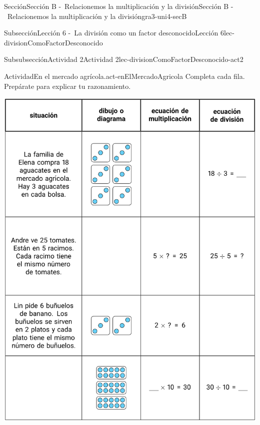 %
%
\typeout{************************************************}
\typeout{************************************************}
%
\begin{sectionptx}{Sección}{Sección B -~Relacionemos la multiplicación y la división}{}{Sección B -~Relacionemos la multiplicación y la división}{}{}{gra3-uni4-secB}
%
%
\typeout{************************************************}
\typeout{************************************************}
%
\begin{subsectionptx}{Subsección}{Lección 6 -~La división como un factor desconocido}{}{Lección 6}{}{}{lec-divisionComoFactorDesconocido}
%
%
\typeout{************************************************}
\typeout{************************************************}
%
\begin{subsubsectionptx}{Subsubsección}{Actividad 2}{}{Actividad 2}{}{}{lec-divisionComoFactorDesconocido-act2}
\begin{activity}{Actividad}{En el mercado agrícola.}{act-enElMercadoAgricola}%
Completa cada fila. Prepárate para explicar tu razonamiento.%
\begin{image}{0}{1}{0}{}%
\includegraphics[max width=1.05\linewidth, center]{external/tikz-source/enElMercadoAgricola-blm-tab.pdf}

\end{image}
\end{activity}
\end{subsubsectionptx}
\end{subsectionptx}
\end{sectionptx}
